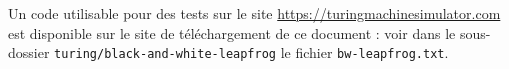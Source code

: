Un code utilisable pour des tests sur le site \url{https://turingmachinesimulator.com} est disponible sur le site de téléchargement de ce document :
voir dans le sous-dossier \verb+turing/black-and-white-leapfrog+ le fichier \verb+bw-leapfrog.txt+.